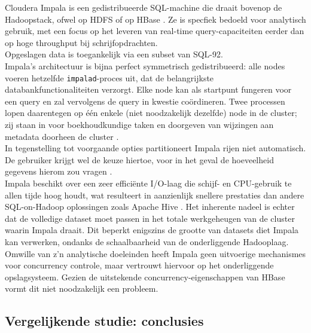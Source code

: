 Cloudera Impala is een gedistribueerde SQL-machine die draait bovenop de Hadoopstack, ofwel op HDFS of op HBase \cite{cloudera_impala}. Ze is specfiek bedoeld voor analytisch gebruik, met een focus op het leveren van real-time query-capaciteiten eerder dan op hoge throughput bij schrijfopdrachten.\\
Opgeslagen data is toegankelijk via een subset van SQL-92.\\
Impala's architectuur is bijna perfect symmetrisch gedistribueerd: alle nodes voeren hetzelfde \texttt{impalad}-proces uit, dat de belangrijkste databankfunctionaliteiten verzorgt. Elke node kan als startpunt fungeren voor een query en zal vervolgens de query in kwestie co\"ordineren. Twee processen lopen daarentegen op \'e\'en enkele (niet noodzakelijk dezelfde) node in de cluster; zij staan in voor boekhoudkundige taken en doorgeven van wijzingen aan metadata doorheen de cluster \cite{impala_components}.\\
In tegenstelling tot voorgaande opties partitioneert Impala rijen niet automatisch. De gebruiker krijgt wel de keuze hiertoe, voor in het geval de hoeveelheid gegevens hierom zou vragen \cite{impala_partitioning}.\\
Impala beschikt over een zeer effici\"ente I/O-laag die schijf- en CPU-gebruik te allen tijde hoog houdt, wat resulteert in aanzienlijk snellere prestaties dan andere SQL-on-Hadoop oplossingen zoals Apache Hive \cite{floratou2014sql}. Het inherente nadeel is echter dat de volledige dataset moet passen in het totale werkgeheugen van de cluster waarin Impala draait. Dit beperkt enigszins de grootte van datasets diet Impala kan verwerken, ondanks de schaalbaarheid van de onderliggende Hadooplaag.\\
Omwille van z'n analytische doeleinden heeft Impala geen uitvoerige mechanismes voor concurrency controle, maar vertrouwt hiervoor op het onderliggende opslagsysteem. Gezien de uitstekende concurrency-eigenschappen van HBase vormt dit niet noodzakelijk een probleem.

\subsection{Vergelijkende studie: conclusies}

